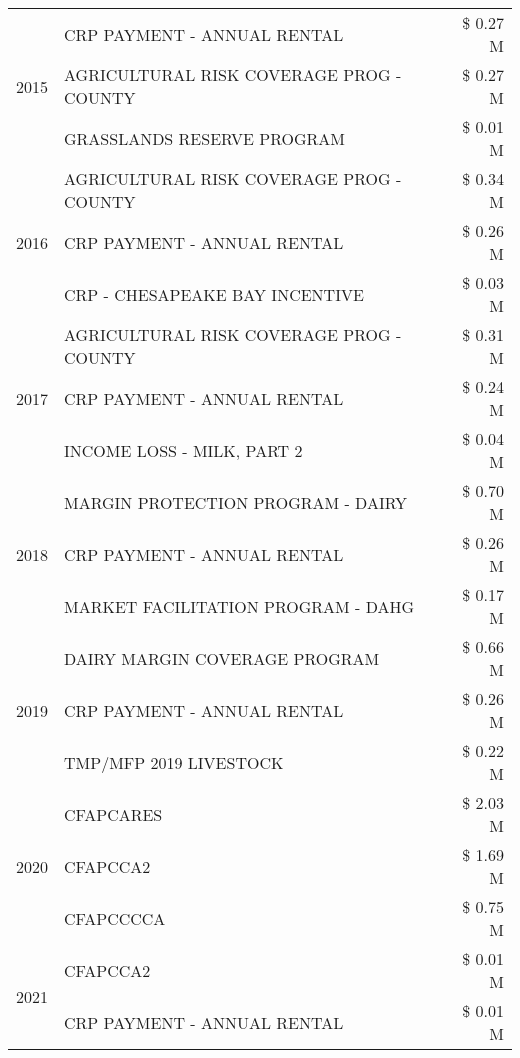\begin{tabular}{llr}
\cline{1-3}
\multirow[t]{3}{*}{2015} & CRP PAYMENT - ANNUAL RENTAL & \$ 0.27 M \\
 & AGRICULTURAL RISK COVERAGE PROG - COUNTY & \$ 0.27 M \\
 & GRASSLANDS RESERVE PROGRAM & \$ 0.01 M \\
\cline{1-3}
\multirow[t]{3}{*}{2016} & AGRICULTURAL RISK COVERAGE PROG - COUNTY & \$ 0.34 M \\
 & CRP PAYMENT - ANNUAL RENTAL & \$ 0.26 M \\
 & CRP - CHESAPEAKE BAY INCENTIVE & \$ 0.03 M \\
\cline{1-3}
\multirow[t]{3}{*}{2017} & AGRICULTURAL RISK COVERAGE PROG - COUNTY & \$ 0.31 M \\
 & CRP PAYMENT - ANNUAL RENTAL & \$ 0.24 M \\
 & INCOME LOSS - MILK, PART 2 & \$ 0.04 M \\
\cline{1-3}
\multirow[t]{3}{*}{2018} & MARGIN PROTECTION PROGRAM - DAIRY & \$ 0.70 M \\
 & CRP PAYMENT - ANNUAL RENTAL & \$ 0.26 M \\
 & MARKET FACILITATION PROGRAM - DAHG & \$ 0.17 M \\
\cline{1-3}
\multirow[t]{3}{*}{2019} & DAIRY MARGIN COVERAGE PROGRAM & \$ 0.66 M \\
 & CRP PAYMENT - ANNUAL RENTAL & \$ 0.26 M \\
 & TMP/MFP 2019 LIVESTOCK & \$ 0.22 M \\
\cline{1-3}
\multirow[t]{3}{*}{2020} & CFAPCARES & \$ 2.03 M \\
 & CFAPCCA2 & \$ 1.69 M \\
 & CFAPCCCCA & \$ 0.75 M \\
\cline{1-3}
\multirow[t]{2}{*}{2021} & CFAPCCA2 & \$ 0.01 M \\
 & CRP PAYMENT - ANNUAL RENTAL & \$ 0.01 M \\
\cline{1-3}
\bottomrule
\end{tabular}
